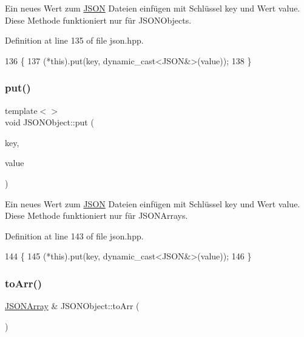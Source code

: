 Ein neues Wert zum \mbox{\hyperlink{class_j_s_o_n}{J\+S\+ON}} Dateien einfügen mit Schlüssel {\ttfamily key} und Wert {\ttfamily value}. Diese Methode funktioniert nur für J\+S\+O\+N\+Objects. 

Definition at line 135 of file json.\+hpp.


\begin{DoxyCode}
136 \{
137     (*this).put(key, dynamic\_cast<JSON&>(value));
138 \}
\end{DoxyCode}
\mbox{\label{class_j_s_o_n_object_afeb8c8e869fed192fb28d19be3b209c0}} 
\subsubsection{\texorpdfstring{put()}{put()}\hspace{0.1cm}{\footnotesize\ttfamily [4/4]}}
{\footnotesize\ttfamily template$<$$>$ \\
void J\+S\+O\+N\+Object\+::put (\begin{DoxyParamCaption}\item[{std\+::string}]{key,  }\item[{\mbox{\hyperlink{class_j_s_o_n_array}{J\+S\+O\+N\+Array}}}]{value }\end{DoxyParamCaption})\hspace{0.3cm}{\ttfamily [inline]}}

Ein neues Wert zum \mbox{\hyperlink{class_j_s_o_n}{J\+S\+ON}} Dateien einfügen mit Schlüssel {\ttfamily key} und Wert {\ttfamily value}. Diese Methode funktioniert nur für J\+S\+O\+N\+Arrays. 

Definition at line 143 of file json.\+hpp.


\begin{DoxyCode}
144 \{
145     (*this).put(key, dynamic\_cast<JSON&>(value));
146 \}
\end{DoxyCode}
\mbox{\label{class_j_s_o_n_object_a00705a3a80423d953af1070da6a4002c}} 
\subsubsection{\texorpdfstring{to\+Arr()}{toArr()}}
{\footnotesize\ttfamily \mbox{\hyperlink{class_j_s_o_n_array}{J\+S\+O\+N\+Array}} \& J\+S\+O\+N\+Object\+::to\+Arr (\begin{DoxyParamCaption}{ }\end{DoxyParamCaption})\hspace{0.3cm}{\ttfamily [inline]}}

